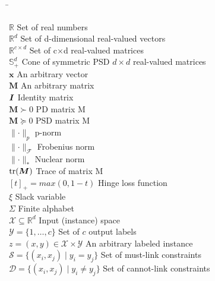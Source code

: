 

\begin{tabbing}
\hspace{150pt}\=\kill

$\mathbb{R}$ \> Set of real numbers \\
$\mathbb{R}^d$ \> Set of d-dimensional real-valued vectors \\
$\mathbb{R}^{c \times d}$ \> Set of c$\times$d real-valued matrices \\
$\mathbb{S}^{d}_+$ \> Cone of symmetric PSD $d \times d$ real-valued matrices \\

$\textbf{x}$ \> An arbitrary vector \\
$\bm{M}$ \> An arbitrary matrix \\
$\textbf{\textit{I}}$ \> Identity matrix \\
$\bm{M} \succ 0$ \> PD matrix M \\
$\bm{M} \succeq 0$ \> PSD matrix M \\
$\parallel \cdot \parallel_p$ \> p-norm \\
$\parallel \cdot \parallel_\mathcal{F}$ \> Frobenius norm \\
$\parallel \cdot \parallel_*$ \> Nuclear norm \\
$\operatorname{tr}(\bm{M})$ \> Trace of matrix M \\
$[t]_+ = max(0, 1-t)$ \> Hinge loss function \\
$\xi$ \> Slack variable \\
$\Sigma$ \> Finite alphabet \\

$\mathcal{X} \subseteq \mathbb{R}^d$ \> Input (instance) space \\
$\mathcal{Y} = \{ 1, \ldots ,c \}$ \> Set of $c$ output labels \\
$z=(x,y) \in \mathcal{X} \times \mathcal{Y}$ \> An arbitrary labeled instance \\

$\mathcal{S} = \{ (x_i, x_j) \mid y_i = y_j \}$ \> Set of must-link constraints \\
$\mathcal{D} = \{ (x_i, x_j) \mid y_i \neq y_j \}$ \> Set of cannot-link constraints \\


\end{tabbing}
